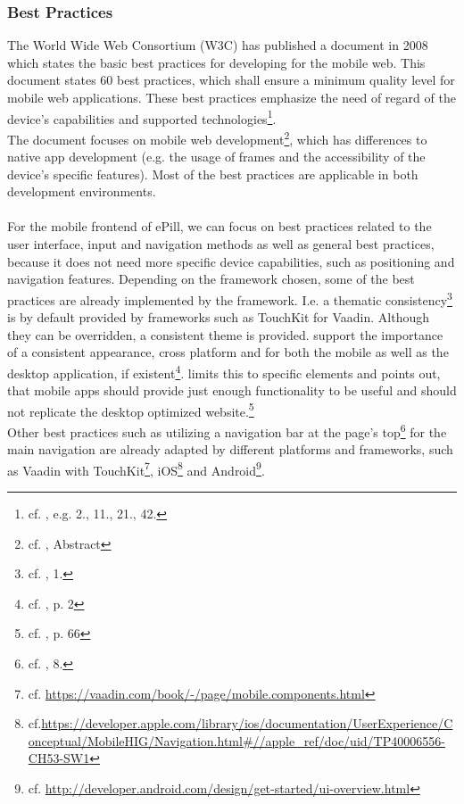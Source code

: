 \subsubsection{Best Practices}
\label{subsec:BestPractices}
The World Wide Web Consortium (W3C) has published a document in 2008 which states the basic best practices for developing for the mobile web. This document states 60 best practices, which shall ensure a minimum quality level for mobile web applications. These best practices emphasize the need of regard of the device's capabilities and supported technologies\footnote{cf. \cite{WorldWideWebConsortium.2008}, e.g. 2., 11., 21., 42.}. 
\\
The document focuses on mobile web development\footnote{cf. \cite{WorldWideWebConsortium.2008}, Abstract}, which has differences to native app development (e.g. the usage of frames and the accessibility of the device's specific features). Most of the best practices are applicable in both development environments.
\\
\\
For the mobile frontend of ePill, we can focus on best practices related to the user interface, input and navigation methods as well as general best practices, because it does not need more specific device capabilities, such as positioning and navigation features. Depending on the framework chosen, some of the best practices are already implemented by the framework. I.e. a thematic consistency\footnote{cf. \cite{WorldWideWebConsortium.2008}, 1.} is by default provided by frameworks such as TouchKit for Vaadin. Although they can be overridden, a consistent theme is provided. \cite{Wessels.2011} support the importance of a consistent appearance, cross platform and for both the mobile as well as the desktop application, if existent\footnote{cf. \cite{Wessels.2011}, p. 2}. \cite{Lica.2010} limits this to specific elements and points out, that mobile apps should provide just enough functionality to be useful and should not replicate the desktop optimized website.\footnote{cf. \cite{Lica.2010}, p. 66}
\\
Other best practices such as utilizing a navigation bar at the page's top\footnote{cf. \cite{WorldWideWebConsortium.2008}, 8.} for the main navigation are already adapted by different platforms and frameworks, such as Vaadin with TouchKit\footnote{cf. \url{https://vaadin.com/book/-/page/mobile.components.html}}, iOS\footnote{cf.\url{https://developer.apple.com/library/ios/documentation/UserExperience/Conceptual/MobileHIG/Navigation.html\#//apple_ref/doc/uid/TP40006556-CH53-SW1}} and Android\footnote{cf. \url{http://developer.android.com/design/get-started/ui-overview.html}}.
